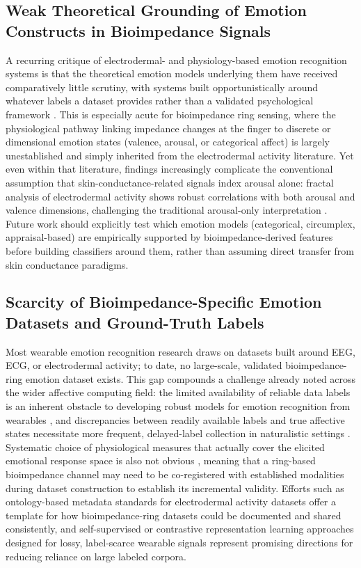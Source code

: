 \subsection{Weak Theoretical Grounding of Emotion Constructs in Bioimpedance Signals}
A recurring critique of electrodermal- and physiology-based emotion recognition systems is that the theoretical emotion models underlying them have received comparatively little scrutiny, with systems built opportunistically around whatever labels a dataset provides rather than a validated psychological framework \cite{damelio2025emotion,damelio2023exploring}. This is especially acute for bioimpedance ring sensing, where the physiological pathway linking impedance changes at the finger to discrete or dimensional emotion states (valence, arousal, or categorical affect) is largely unestablished and simply inherited from the electrodermal activity literature. Yet even within that literature, findings increasingly complicate the conventional assumption that skin-conductance-related signals index arousal alone: fractal analysis of electrodermal activity shows robust correlations with both arousal and valence dimensions, challenging the traditional arousal-only interpretation \cite{diaz2024fractal}. Future work should explicitly test which emotion models (categorical, circumplex, appraisal-based) are empirically supported by bioimpedance-derived features before building classifiers around them, rather than assuming direct transfer from skin conductance paradigms.

\subsection{Scarcity of Bioimpedance-Specific Emotion Datasets and Ground-Truth Labels}
Most wearable emotion recognition research draws on datasets built around EEG, ECG, or electrodermal activity; to date, no large-scale, validated bioimpedance-ring emotion dataset exists. This gap compounds a challenge already noted across the wider affective computing field: the limited availability of reliable data labels is an inherent obstacle to developing robust models for emotion recognition from wearables \cite{dissanayake2022sigrep}, and discrepancies between readily available labels and true affective states necessitate more frequent, delayed-label collection in naturalistic settings \cite{moontaha2023online}. Systematic choice of physiological measures that actually cover the elicited emotional response space is also not obvious \cite{hui2018coverage}, meaning that a ring-based bioimpedance channel may need to be co-registered with established modalities during dataset construction to establish its incremental validity. Efforts such as ontology-based metadata standards for electrodermal activity datasets \cite{zawadzka2023ontological} offer a template for how bioimpedance-ring datasets could be documented and shared consistently, and self-supervised or contrastive representation learning approaches designed for lossy, label-scarce wearable signals \cite{dissanayake2022sigrep,wu2023transformer} represent promising directions for reducing reliance on large labeled corpora.

